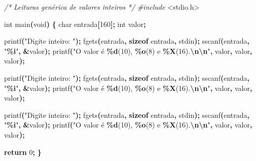 \documentclass[
  11pt,
  a4paper,
]{scrbook}
\newenvironment{Shaded}{\begin{snugshade}}{\end{snugshade}}
\newcommand{\CommentTok}[1]{\textcolor[rgb]{0.56,0.35,0.01}{\textit{#1}}}
\newcommand{\ControlFlowTok}[1]{\textcolor[rgb]{0.13,0.29,0.53}{\textbf{#1}}}
\newcommand{\DataTypeTok}[1]{\textcolor[rgb]{0.13,0.29,0.53}{#1}}
\newcommand{\DecValTok}[1]{\textcolor[rgb]{0.00,0.00,0.81}{#1}}
\newcommand{\ImportTok}[1]{#1}
\newcommand{\KeywordTok}[1]{\textcolor[rgb]{0.13,0.29,0.53}{\textbf{#1}}}
\newcommand{\NormalTok}[1]{#1}
\newcommand{\OperatorTok}[1]{\textcolor[rgb]{0.81,0.36,0.00}{\textbf{#1}}}
\newcommand{\PreprocessorTok}[1]{\textcolor[rgb]{0.56,0.35,0.01}{\textit{#1}}}
\newcommand{\SpecialCharTok}[1]{\textcolor[rgb]{0.81,0.36,0.00}{\textbf{#1}}}
\newcommand{\StringTok}[1]{\textcolor[rgb]{0.31,0.60,0.02}{#1}}
\begin{document}
\begin{Shaded}
\begin{Highlighting}[]
\CommentTok{/*}
\CommentTok{Leituras genérica de valores inteiros}
\CommentTok{*/}
\PreprocessorTok{\#include }\ImportTok{\textless{}stdio.h\textgreater{}}

\DataTypeTok{int}\NormalTok{ main}\OperatorTok{(}\DataTypeTok{void}\OperatorTok{)} \OperatorTok{\{}
    \DataTypeTok{char}\NormalTok{ entrada}\OperatorTok{[}\DecValTok{160}\OperatorTok{];}
    \DataTypeTok{int}\NormalTok{ valor}\OperatorTok{;}

\NormalTok{    printf}\OperatorTok{(}\StringTok{"Digite inteiro: "}\OperatorTok{);}
\NormalTok{    fgets}\OperatorTok{(}\NormalTok{entrada}\OperatorTok{,} \KeywordTok{sizeof}\NormalTok{ entrada}\OperatorTok{,}\NormalTok{ stdin}\OperatorTok{);}
\NormalTok{    sscanf}\OperatorTok{(}\NormalTok{entrada}\OperatorTok{,} \StringTok{"}\SpecialCharTok{\%i}\StringTok{"}\OperatorTok{,} \OperatorTok{\&}\NormalTok{valor}\OperatorTok{);}
\NormalTok{    printf}\OperatorTok{(}\StringTok{"O valor é }\SpecialCharTok{\%d}\StringTok{(10), }\SpecialCharTok{\%o}\StringTok{(8) e }\SpecialCharTok{\%X}\StringTok{(16).}\SpecialCharTok{\textbackslash{}n\textbackslash{}n}\StringTok{"}\OperatorTok{,}\NormalTok{ valor}\OperatorTok{,}\NormalTok{ valor}\OperatorTok{,}\NormalTok{ valor}\OperatorTok{);}

\NormalTok{    printf}\OperatorTok{(}\StringTok{"Digite inteiro: "}\OperatorTok{);}
\NormalTok{    fgets}\OperatorTok{(}\NormalTok{entrada}\OperatorTok{,} \KeywordTok{sizeof}\NormalTok{ entrada}\OperatorTok{,}\NormalTok{ stdin}\OperatorTok{);}
\NormalTok{    sscanf}\OperatorTok{(}\NormalTok{entrada}\OperatorTok{,} \StringTok{"}\SpecialCharTok{\%i}\StringTok{"}\OperatorTok{,} \OperatorTok{\&}\NormalTok{valor}\OperatorTok{);}
\NormalTok{    printf}\OperatorTok{(}\StringTok{"O valor é }\SpecialCharTok{\%d}\StringTok{(10), }\SpecialCharTok{\%o}\StringTok{(8) e }\SpecialCharTok{\%X}\StringTok{(16).}\SpecialCharTok{\textbackslash{}n\textbackslash{}n}\StringTok{"}\OperatorTok{,}\NormalTok{ valor}\OperatorTok{,}\NormalTok{ valor}\OperatorTok{,}\NormalTok{ valor}\OperatorTok{);}

\NormalTok{    printf}\OperatorTok{(}\StringTok{"Digite inteiro: "}\OperatorTok{);}
\NormalTok{    fgets}\OperatorTok{(}\NormalTok{entrada}\OperatorTok{,} \KeywordTok{sizeof}\NormalTok{ entrada}\OperatorTok{,}\NormalTok{ stdin}\OperatorTok{);}
\NormalTok{    sscanf}\OperatorTok{(}\NormalTok{entrada}\OperatorTok{,} \StringTok{"}\SpecialCharTok{\%i}\StringTok{"}\OperatorTok{,} \OperatorTok{\&}\NormalTok{valor}\OperatorTok{);}
\NormalTok{    printf}\OperatorTok{(}\StringTok{"O valor é }\SpecialCharTok{\%d}\StringTok{(10), }\SpecialCharTok{\%o}\StringTok{(8) e }\SpecialCharTok{\%X}\StringTok{(16).}\SpecialCharTok{\textbackslash{}n\textbackslash{}n}\StringTok{"}\OperatorTok{,}\NormalTok{ valor}\OperatorTok{,}\NormalTok{ valor}\OperatorTok{,}\NormalTok{ valor}\OperatorTok{);}

    \ControlFlowTok{return} \DecValTok{0}\OperatorTok{;}
\OperatorTok{\}}
\end{Highlighting}
\end{Shaded}
\end{document}
